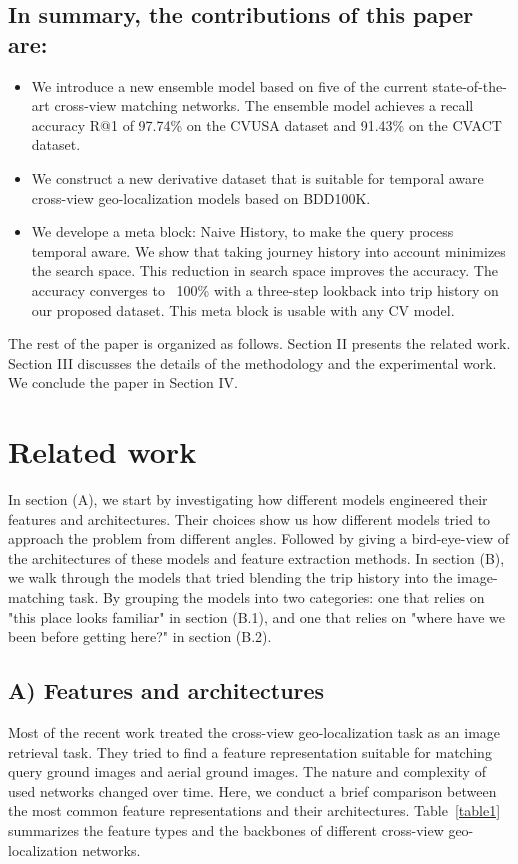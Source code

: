 \documentclass[10pt,letterpaper]{article}
\begin{document}
\subsection*{In summary, the contributions of this paper are:}
\begin{itemize}
    \item We introduce a new ensemble model based on five of the current state-of-the-art  cross-view matching networks. The ensemble model achieves a recall accuracy R@1 of 97.74\% on the CVUSA dataset and 91.43\% on the CVACT dataset.
    \item We construct a new derivative dataset that is suitable for temporal aware cross-view geo-localization models based on BDD100K.
    \item We develope a meta block: Naive History, to make the query process temporal aware. We show that taking journey history into account minimizes the search space. This reduction in search space improves the accuracy.  The accuracy converges to ~100\% with a three-step lookback into trip history on our proposed dataset. This meta block is usable with any CV model.
\end{itemize}

The rest of the paper is organized as follows. Section II presents the related work. Section III discusses the details of the methodology and the experimental work. We conclude the paper in Section IV.

\section*{Related work}
In section (A), we start by investigating how different models engineered their features and architectures. Their choices show us how different models tried to approach the problem from different angles. Followed by giving a bird-eye-view of the architectures of these models and feature extraction methods. In section (B), we walk through the models that tried blending the trip history into the image-matching task. By grouping the models into two categories: one that relies on "this place looks familiar" in section (B.1), and one that relies on "where have we been before getting here?" in section (B.2).
\subsection*{A) Features and architectures}
Most of the recent work treated the cross-view geo-localization task as an image retrieval task. They tried to find a feature representation suitable for matching query ground images and aerial ground images. The nature and complexity of used networks changed over time. Here, we conduct a brief comparison between the most common feature representations and their architectures. Table~\ref{table1} summarizes the feature types and the backbones of different cross-view geo-localization networks.
\end{document}
